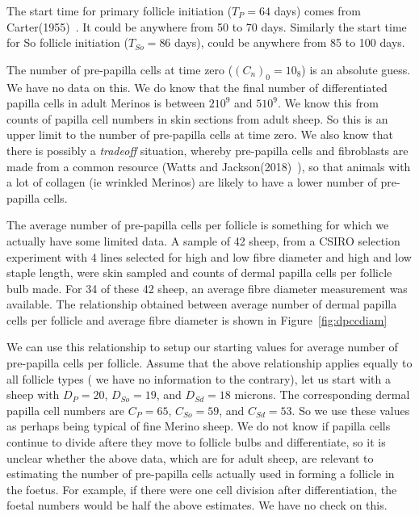 \documentclass[titlepage]{article}  %
\begin{document}
 The start time for primary follicle initiation ($T_{P} = 64$ days) comes from Carter(1955)~\cite{cart:55}. It could be anywhere from 50 to 70 days. Similarly the start time for So follicle initiation ($T_{So} = 86$ days), could be anywhere from 85 to 100 days.

 The number of pre-papilla cells at time zero ($(C_{n})_{0} = 10_{8}$) is an absolute guess. We have no data on this. We do know that the final number of differentiated papilla cells in adult Merinos is between $2 10^{9}$ and $5 10^{9}$. We know this from counts of papilla cell numbers in skin sections from adult sheep. So this is an upper limit to the number of pre-papilla cells at time zero. We also know that there is possibly a {\em tradeoff} situation, whereby pre-papilla cells and fibroblasts are made from a common resource (Watts and Jackson(2018)~\cite{watt:18}), so that animals with a lot of collagen (ie wrinkled Merinos) are likely to have a lower number of pre-papilla cells.

 The average number of pre-papilla cells per follicle  is something for which we actually have some limited data. A sample of 42 sheep, from a CSIRO selection experiment with  4 lines selected for high and low fibre diameter and high and low staple length, were skin sampled and counts of dermal papilla cells per follicle bulb made. For 34 of these 42 sheep, an average fibre diameter measurement was available. The relationship obtained between average number of dermal papilla cells per follicle and average fibre diameter is shown in Figure~\ref{fig:dpccdiam}

 We can use this relationship to setup our starting values for average number of pre-papilla cells per follicle. Assume that the above relationship applies equally to all follicle types ( we have no information to the contrary), let us start with a sheep with $D_{P}=20$, $D_{So}=19$, and $D_{Sd}=18$ microns. The corresponding dermal papilla cell numbers are $C_{P}=65$, $C_{So}=59$, and $C_{Sd}=53$.  So we use these values as perhaps being typical of fine Merino sheep. We do not know if papilla cells continue to divide aftere they move to follicle bulbs and differentiate, so it is unclear whether the above data, which are for adult sheep, are relevant to estimating the number of pre-papilla cells actually used in forming a follicle in the foetus. For example, if there were one cell division after differentiation, the foetal numbers would be half the above estimates. We have no check on this.
\end{document}
